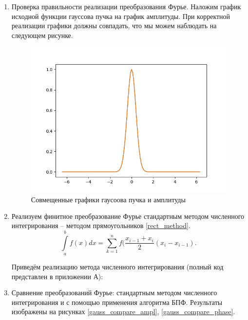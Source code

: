 {\begin{enumerate}
		\item{
			Проверка правильности реализации преобразования Фурье. Наложим график исходной функции гауссова пучка на график амплитуды. При корректной реализации графики должны совпадать, что мы можем наблюдать на следующем рисунке.
			
			\begin{figure}[H]
				\begin{center}
				\includegraphics[scale=0.7]{gauss_check}
				\caption{Совмещенные графики гаусоова пучка и амплитуды}
				\label{gauss_check}
				\end{center}
			\end{figure}
		}
		
		\item{
		Реализуем финитное преобразование Фурье стандартным методом численного интегрирования -- методом прямоугольников \eqref{rect_method}.
		\begin{equation}\label{rect_method}
		\int\limits_a^b f(x) dx = \sum\limits_{k=1}^n f(\dfrac{x_{i - 1} + x_i}{2} (x_i - x_{i - 1}).
		\end{equation}
		
			Приведём реализацию метода численного интегрирования (полный код представлен в приложении А):
			
		}
		
		\item{
		Сравнение преобразований Фурье: стандартным методом численного интегрирования и с помощью применения алгоритма БПФ. Результаты изображены на рисунках \ref{gauss_compare_ampl}, \ref{gauss_compare_phase}.
		
}
\end{enumerate}}
